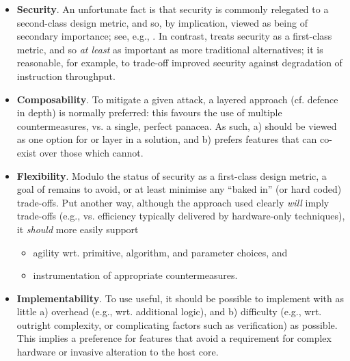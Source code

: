 \begin{itemize}
\begin{itemize}
      \item {\bf         Security}.
            An unfortunate fact is that security is commonly relegated to a 
            second-class design metric, and so, by implication, viewed as 
            being of secondary importance;
            see, e.g., \cite{SCARV:RKLMR:03,SCARV:RRKH:04,SCARV:BurMutTiw:16}.
            In contrast, \ISE treats security as a first-class metric, and
            so {\em at least} as important as more traditional alternatives; 
            it is reasonable, for example, to trade-off improved security 
            against degradation of instruction throughput.

      \item {\bf    Composability}.
            To mitigate a given attack, a layered approach (cf. defence in 
            depth) is normally preferred: this favours the use of multiple
            countermeasures, vs. a single, perfect panacea.  As such, \ISE
            a) should be viewed as one option for or layer in a solution,
               and
            b) prefers features that can co-exist over those which cannot.

      \item {\bf      Flexibility}. 
            Modulo the status of security as a first-class design metric, a
            goal of \ISE remains to avoid, or at least minimise any ``baked 
            in'' (or hard coded) trade-offs.  Put another way, although the 
            approach used clearly {\em will} imply trade-offs 
            (e.g., vs. efficiency typically delivered by hardware-only techniques), 
            it {\em should} more easily support

            \begin{itemize}
            \item agility wrt. primitive, algorithm, and parameter choices,
                  and
            \item instrumentation of appropriate countermeasures.
            \end{itemize}

      \item {\bf Implementability}. 
            To use useful, it should be possible to implement \ISE with as
            little
            a) overhead   (e.g., wrt. additional logic),
               and
            b) difficulty (e.g., wrt. outright complexity, or complicating factors such as verification)
            as possible.
            This implies a preference for features that avoid a requirement 
            for complex hardware or invasive alteration to the host core.


\end{itemize}
\end{itemize}
